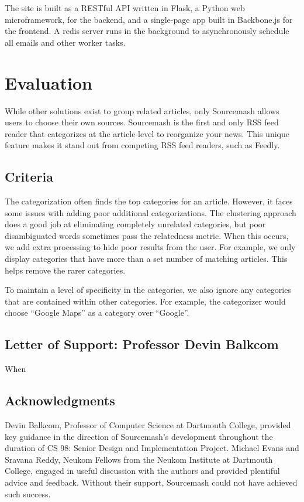 \documentclass[11pt]{article}
\begin{document}
The site is built as a RESTful API written in Flask, a Python web microframework, for the backend, and a single-page app built in Backbone.js for the frontend. A redis server runs in the background to asynchronously schedule all emails and other worker tasks.


\section{Evaluation}

While other solutions exist to group related articles, only Sourcemash allows users to choose their own sources. Sourcemash is the first and only RSS feed reader that categorizes at the article-level to reorganize your news. This unique feature makes it stand out from competing RSS feed readers, such as Feedly.

\subsection{Criteria}
The categorization often finds the top categories for an article. However, it faces some issues with adding poor additional categorizations. The clustering approach does a good job at eliminating completely unrelated categories, but poor disambiguated words sometimes pass the relatedness metric. When this occurs, we add extra processing to hide poor results from the user. For example, we only display categories that have more than a set number of matching articles. This helps remove the rarer categories.

To maintain a level of specificity in the categories, we also ignore any categories that are contained within other categories. For example, the categorizer would choose ``Google Maps'' as a category over ``Google''.


\subsection{Letter of Support: Professor Devin Balkcom}

When



\subsection*{Acknowledgments}
Devin Balkcom, Professor of Computer Science at Dartmouth College, provided key guidance in the direction of Sourcemash's development throughout the duration of CS 98: Senior Design and Implementation Project. Michael Evans and Sravana Reddy, Neukom Fellows from the Neukom Institute at Dartmouth College, engaged in useful discussion with the authors and provided plentiful advice and feedback. Without their support, Sourcemash could not have achieved such success.
\end{document}
